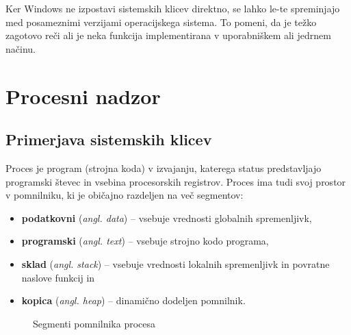 \documentclass[a4paper,12pt,openright]{book}
\begin{document}
Ker Windows ne izpostavi sistemskih klicev direktno, se lahko le-te spreminjajo med posameznimi verzijami operacijskega sistema.
To pomeni, da je težko zagotovo reči ali je neka funkcija implementirana v uporabniškem ali jedrnem načinu.
\cite{Tanenbaum_Bos_2023}

\chapter{Procesni nadzor} \label{sec:process_control}

\section{Primerjava sistemskih klicev}

Proces je program (strojna koda) v izvajanju, katerega status predstavljajo programski števec in vsebina procesorskih registrov.
Proces ima tudi svoj prostor v pomnilniku, ki je običajno razdeljen na več segmentov:
\begin{itemize}
	\item \textbf{podatkovni} (\textit{angl. data}) -- vsebuje vrednosti globalnih spremenljivk,
	\item \textbf{programski} (\textit{angl. text}) -- vsebuje strojno kodo programa,
	\item \textbf{sklad} (\textit{angl. stack}) -- vsebuje vrednosti lokalnih spremenljivk in povratne naslove funkcij in
	\item \textbf{kopica} (\textit{angl. heap}) -- dinamično dodeljen pomnilnik. \cite{Silberschatz_Galvin_Gagne_2018}
\end{itemize}

\begin{figure}[h!]
	\begin{center}
	\end{center}
	\caption{Segmenti pomnilnika procesa}
\end{figure}
\end{document}
